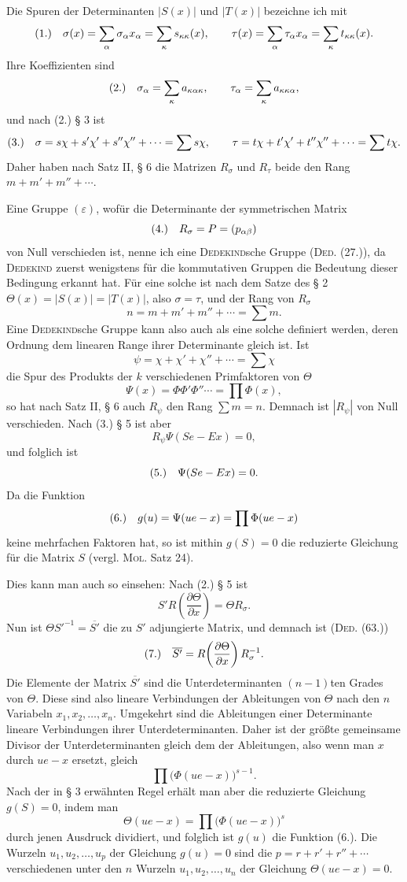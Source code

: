 \documentclass[11pt]{article}
\newcommand{\eps}{\varepsilon}
\newcommand{\fnum}[1]{\textup{(\ensuremath{#1}.)}\quad}
\begin{document}
Die Spuren der Determinanten $|S(x)|$ und $|T(x)|$ bezeichne ich mit
\[
\fnum{1} \sigma(x)=\sum_\alpha \sigma_\alpha x_\alpha=\sum_\kappa s_{\kappa\kappa}(x),\qquad
\tau(x)=\sum_\alpha \tau_\alpha x_\alpha=\sum_\kappa t_{\kappa\kappa}(x).
\]
Ihre Koeffizienten sind
\[
\fnum{2} \sigma_\alpha=\sum_\kappa a_{\kappa\alpha\kappa},\qquad
\tau_\alpha=\sum_\kappa a_{\kappa\kappa\alpha},
\]
und nach (2.) § 3 ist
\[
\fnum{3} \sigma=s\chi+s'\chi'+s''\chi''+\cdots=\sum s\chi,
\qquad
\tau=t\chi+t'\chi'+t''\chi''+\cdots=\sum t\chi.
\]
Daher haben nach Satz II, § 6 die Matrizen $R_\sigma$ und $R_\tau$ beide den Rang $m+m'+m''+\cdots$.

Eine Gruppe $(\eps)$, wofür die Determinante der symmetrischen Matrix
\[
\fnum{4} R_\sigma=P=(p_{\alpha\beta})
\]
von Null verschieden ist, nenne ich eine \textsc{Dedekind}sche Gruppe (\textsc{Ded}. (27.)), da \textsc{Dedekind} zuerst wenigstens für die kommutativen Gruppen die Bedeutung dieser Bedingung erkannt hat. Für eine solche ist nach dem Satze des § 2 $\Theta(x)=|S(x)|=|T(x)|$, also $\sigma=\tau$, und der Rang von $R_\sigma$
\[
 n=m+m'+m''+\cdots=\sum m.
\]
Eine \textsc{Dedekind}sche Gruppe kann also auch als eine solche definiert werden, deren Ordnung dem linearen Range ihrer Determinante gleich ist. Ist
\[
 \psi=\chi+\chi'+\chi''+\cdots=\sum\chi
\]
die Spur des Produkts der $k$ verschiedenen Primfaktoren von $\Theta$
\[
 \Psi(x)=\Phi\Phi'\Phi''\cdots=\prod\Phi(x),
\]
so hat nach Satz II, § 6 auch $R_\psi$ den Rang $\sum m=n$. Demnach ist $|R_\psi|$ von Null verschieden. Nach (3.) § 5 ist aber
\[
 R_\psi\Psi(Se-Ex)=0,
\]
und folglich ist
\[
\fnum{5} \Psi(Se-Ex)=0.
\]
Da die Funktion
\[
\fnum{6} g(u)=\Psi(ue-x)=\prod\Phi(ue-x)
\]
keine mehrfachen Faktoren hat, so ist mithin $g(S)=0$ die reduzierte Gleichung für die Matrix $S$ (vergl. \textsc{Mol}. Satz 24).

Dies kann man auch so einsehen: Nach (2.) § 5 ist
\[
 S'R\!\left(\frac{\partial\Theta}{\partial x}\right)=\Theta R_\sigma.
\]
Nun ist $\Theta S'^{-1}=\overline{S'}$ die zu $S'$ adjungierte Matrix, und demnach ist (\textsc{Ded}. (63.))
\[
\fnum{7} \overline{S'}=R\!\left(\frac{\partial\Theta}{\partial x}\right)R_\sigma^{-1}.
\]
Die Elemente der Matrix $\overline{S'}$ sind die Unterdeterminanten $(n-1)$ten Grades von $\Theta$. Diese sind also lineare Verbindungen der Ableitungen von $\Theta$ nach den $n$ Variabeln $x_1,x_2,\ldots,x_n$. Umgekehrt sind die Ableitungen einer Determinante lineare Verbindungen ihrer Unterdeterminanten. Daher ist der größte gemeinsame Divisor der Unterdeterminanten gleich dem der Ableitungen, also wenn man $x$ durch $ue-x$ ersetzt, gleich
\[
 \prod\bigl(\Phi(ue-x)\bigr)^{s-1}.
\]
Nach der in § 3 erwähnten Regel erhält man aber die reduzierte Gleichung $g(S)=0$, indem man
\[
 \Theta(ue-x)=\prod\bigl(\Phi(ue-x)\bigr)^s
\]
durch jenen Ausdruck dividiert, und folglich ist $g(u)$ die Funktion (6.). Die Wurzeln $u_1,u_2,\ldots,u_p$ der Gleichung $g(u)=0$ sind die $p=r+r'+r''+\cdots$ verschiedenen unter den $n$ Wurzeln $u_1,u_2,\ldots,u_n$ der Gleichung $\Theta(ue-x)=0$.
\end{document}
